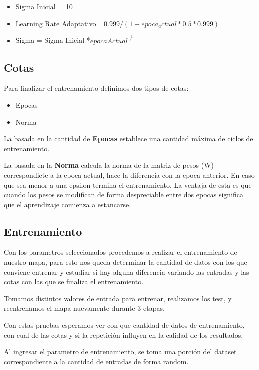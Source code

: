 \begin{itemize}
	\item Sigma Inicial = 10
	\item Learning Rate Adaptativo =$ 0.999 / (1 + epoca_actual * 0.5 * 0.999)$
	\item Sigma = Sigma Inicial *$ {epocaActual^\frac{-1}{3}}$
\end{itemize}


\subsection{Cotas}

Para finalizar el entrenamiento definimos dos tipos de cotas:

\begin{itemize}
	\item Epocas
	\item Norma
\end{itemize}

La basada en la cantidad de \textbf{Epocas} establece una cantidad máxima de
ciclos de entrenamiento.

La basada en la \textbf{Norma} calcula la norma de la matriz de pesos (W) 
correspondiete a la epoca actual, hace la diferencia con la epoca anterior.
En caso que sea menor a una epsilon termina el entrenamiento. La ventaja
de esta es que cuando los pesos se modifican de forma despreciable entre
dos epocas significa que el aprendizaje comienza a estancarse.


\subsection{Entrenamiento}

Con los parametros seleccionados procedemos a realizar el entrenamiento de
nuestro mapa, para esto nos queda determinar la cantidad de datos con los que
conviene entrenar y estudiar si hay alguna diferencia variando las entradas
y las cotas con las que se finaliza el entrenamiento.

Tomamos distintos valores de entrada para entrenar, realizamos los test, y
reentrenamos el mapa nuevamente durante 3 etapas.

Con estas pruebas esperamos ver con que cantidad de datos de entrenamiento, 
con cual de las cotas y si la repetición influyen en la calidad de los resultados.

Al ingresar el parametro de entrenamiento, se toma una porción del dataset correspondiente
a la cantidad de entradas de forma random.

